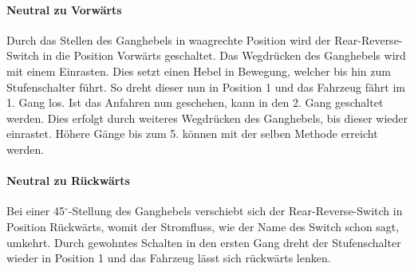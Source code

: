\paragraph{Neutral zu Vorwärts}
Durch das Stellen des Ganghebels in waagrechte Position wird der Rear-Reverse-Switch in die Position Vorwärts geschaltet. Das Wegdrücken des Ganghebels wird mit einem Einrasten. Dies setzt einen Hebel in Bewegung, welcher bis hin zum Stufenschalter führt. So dreht dieser nun in Position 1 und das Fahrzeug fährt im 1. Gang los. Ist das Anfahren nun geschehen, kann in den 2. Gang geschaltet werden. Dies erfolgt durch weiteres Wegdrücken des Ganghebels, bis dieser wieder einrastet. Höhere Gänge bis zum 5. können mit der selben Methode erreicht werden.

\paragraph{Neutral zu Rückwärts}
Bei einer 45$^\circ$-Stellung des Ganghebels verschiebt sich der Rear-Reverse-Switch in Position Rückwärts, womit der Stromfluss, wie der Name des Switch schon sagt, umkehrt. Durch gewohntes Schalten in den ersten Gang dreht der Stufenschalter wieder in Position 1 und das Fahrzeug lässt sich rückwärts lenken.